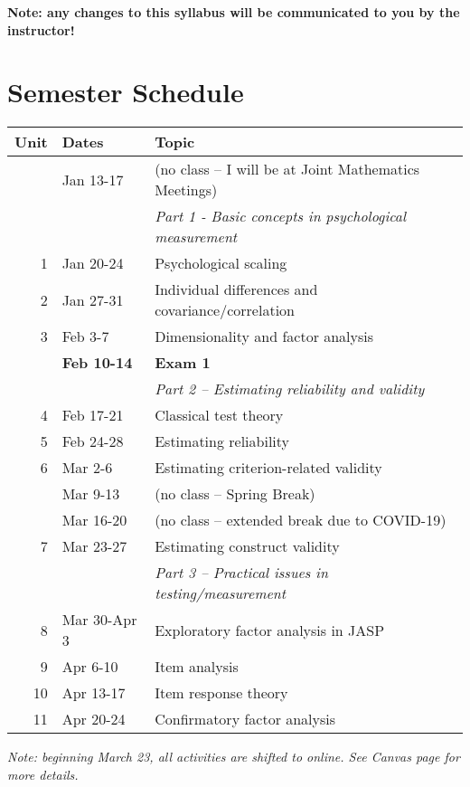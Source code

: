 \documentclass[10pt]{article}
\begin{document}
\textbf{Note:  any changes to this syllabus will be communicated to you by the instructor!}


\section*{Semester Schedule}
\label{sec:org12f8a5f}
\begin{center}
\begin{tabular}{rll}
Unit & Dates & Topic\\
\hline
 & Jan 13-17 & (no class -- I will be at Joint Mathematics Meetings)\\
 &  & \emph{Part 1 - Basic concepts in psychological measurement}\\
1 & Jan 20-24 & Psychological scaling\\
2 & Jan 27-31 & Individual differences and covariance/correlation\\
3 & Feb 3-7 & Dimensionality and factor analysis\\
 & \textbf{Feb 10-14} & \textbf{Exam 1}\\
\hline
 &  & \emph{Part 2 -- Estimating reliability and validity}\\
4 & Feb 17-21 & Classical test theory\\
5 & Feb 24-28 & Estimating reliability\\
6 & Mar 2-6 & Estimating criterion-related validity\\
 & Mar 9-13 & (no class -- Spring Break)\\
 & Mar 16-20 & (no class -- extended break due to COVID-19)\\
7 & Mar 23-27 & Estimating construct validity\\
\hline
 &  & \emph{Part 3 -- Practical issues in testing/measurement}\\
8 & Mar 30-Apr 3 & Exploratory factor analysis in JASP\\
9 & Apr 6-10 & Item analysis\\
10 & Apr 13-17 & Item response theory\\
11 & Apr 20-24 & Confirmatory factor analysis\\
\hline
\end{tabular}
\end{center}

\emph{Note: beginning March 23, all activities are shifted to online. See Canvas page for more details.}
\end{document}
